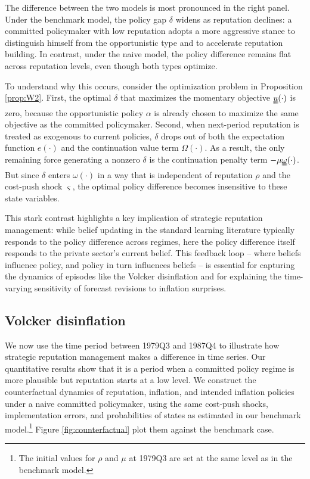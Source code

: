 \documentclass[12pt,letter,leqno]{article}
\theoremstyle{asn}
\theoremstyle{lem}
\theoremstyle{slem}
\theoremstyle{prop}
\theoremstyle{appprop}
\theoremstyle{rem}
\theoremstyle{defn}
\begin{document}
The difference between the two models is most pronounced in the right panel. Under the benchmark model, the policy gap $\delta$ widens as reputation declines: a committed policymaker with low reputation adopts a more aggressive stance to distinguish himself from the opportunistic type and to accelerate reputation building. In contrast, under the naive model, the policy difference remains flat across reputation levels, even though both types optimize.

To understand why this occurs, consider the optimization problem in Proposition \ref{prop:W2}. First, the optimal $\delta$ that maximizes the momentary objective $\uuline{u}(\cdot)$ is zero, because the opportunistic policy $\alpha$ is already chosen to maximize the same objective as the committed policymaker. Second, when next-period reputation is treated as exogenous to current policies, $\delta$ drops out of both the expectation function $e(\cdot)$ and the continuation value term $\Omega(\cdot)$. As a result, the only remaining force generating a nonzero $\delta$ is the continuation penalty term $-\mu \uuline{\omega}(\cdot)$. But since $\delta$ enters $\omega(\cdot)$ in a way that is independent of reputation $\rho$ and the cost-push shock $\varsigma$, the optimal policy difference becomes insensitive to these state variables.

This stark contrast highlights a key implication of strategic reputation management: while belief updating in the standard learning literature typically responds to the policy difference across regimes, here the policy difference itself responds to the private sector’s current belief. This feedback loop -- where beliefs influence policy, and policy in turn influences beliefs -- is essential for capturing the dynamics of episodes like the Volcker disinflation and for explaining the time-varying sensitivity of forecast revisions to inflation surprises.



\subsection{Volcker disinflation} 
We now use the time period between 1979Q3 and 1987Q4 to illustrate how strategic reputation management makes a difference in time series. Our quantitative results show that it is a period when a committed policy regime is more plausible but reputation starts at a low level. We construct the counterfactual dynamics of reputation, inflation, and intended inflation policies under a naive committed policymaker, using the same cost-push shocks, implementation errors, and probabilities of states as estimated in our benchmark model.\footnote{The initial values for $\rho$ and $\mu$ at 1979Q3 are set at the same level as in the benchmark model.} Figure \ref{fig:counterfactual} plot them against the benchmark case.
\end{document}
